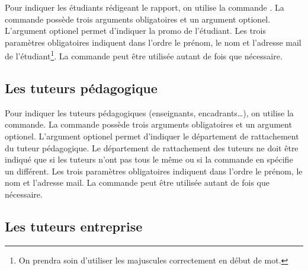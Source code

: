 \documentclass[overfullbox,hideweeklyreports,noseparatecontributorspage,nodate]{polytech}
\begin{document}
Pour indiquer les étudiants rédigeant le rapport, on utilise la commande \latexcode{\\student}. La commande possède trois arguments obligatoires et un argument optionel. L'argument optionel permet d'indiquer la promo de l'étudiant. Les trois paramètres obligatoires indiquent dans l'ordre le prénom, le nom et l'adresse mail de l'étudiant\footnote{On prendra soin d'utiliser les majuscules correctement en début de mot.}. La commande  \latexcode{\\student} peut être utilisée autant de fois que nécessaire.

\begin{latexsource}
\end{latexsource}

\subsection{Les tuteurs pédagogique}

Pour indiquer les tuteurs pédagogiques (enseignants, encadrants\ldots), on utilise la commande\linebreak \latexcode{\\academicsupervisor}. La commande possède trois arguments obligatoires et un argument optionel. L'argument optionel permet d'indiquer le département de rattachement du tuteur pédagogique. Le département de rattachement des tuteurs ne doit être indiqué que si les tuteurs n'ont pas tous le même ou si la commande \latexcode{\\schooldepartment} en spécifie un différent. Les trois paramètres obligatoires indiquent dans l'ordre le prénom, le nom et l'adresse mail. La commande \linebreak \latexcode{\\academicsupervisor} peut être utilisée autant de fois que nécessaire.

\begin{latexsource}
\end{latexsource}

\subsection{Les tuteurs entreprise}
\end{document}
